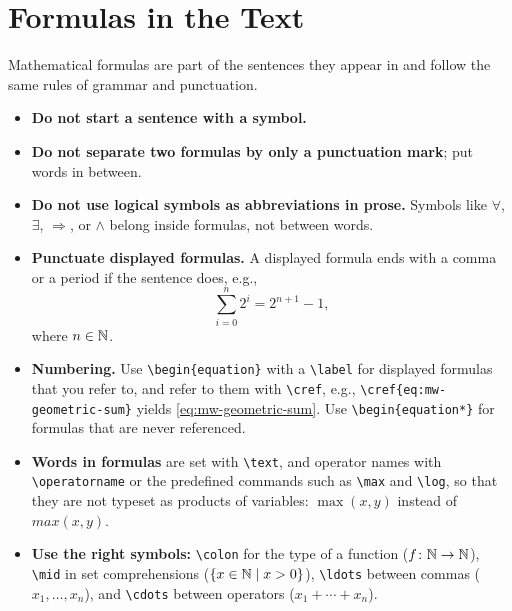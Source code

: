 \section{Formulas in the Text}\label{sec:mw-formulas}

Mathematical formulas are part of the sentences they appear in and follow the
same rules of grammar and punctuation.

\begin{itemize}
    \item \textbf{Do not start a sentence with a symbol.}
    \item \textbf{Do not separate two formulas by only a punctuation mark};
          put words in between.
    \item \textbf{Do not use logical symbols as abbreviations in prose.}
          Symbols like $\forall$, $\exists$, $\Rightarrow$, or $\wedge$
          belong inside formulas, not between words.
    \item \textbf{Punctuate displayed formulas.}
          A displayed formula ends with a comma or a period if the sentence
          does, e.g.,
          \begin{equation}\label{eq:mw-geometric-sum}
              \sum_{i=0}^{n} 2^i = 2^{n+1} - 1,
          \end{equation}
          where $n \in \mathbb{N}$.
    \item \textbf{Numbering.}
          Use \lstinline|\begin{equation}| with a \lstinline|\label| for
          displayed formulas that you refer to, and refer to them with
          \lstinline|\cref|, e.g., \lstinline|\cref{eq:mw-geometric-sum}|
          yields \cref{eq:mw-geometric-sum}.
          Use \lstinline|\begin{equation*}| for formulas that are never
          referenced.
    \item \textbf{Words in formulas} are set with \lstinline|\text|, and
          operator names with \lstinline|\operatorname| or the predefined
          commands such as \lstinline|\max| and \lstinline|\log|, so that they
          are not typeset as products of variables:
          $\max(x, y)$ instead of $max(x, y)$.
    \item \textbf{Use the right symbols:}
          \lstinline|\colon| for the type of a function
          ($f \colon \mathbb{N} \to \mathbb{N}$),
          \lstinline|\mid| in set comprehensions
          ($\lbrace x \in \mathbb{N} \mid x > 0\rbrace$),
          \lstinline|\ldots| between commas ($x_1, \ldots, x_n$), and
          \lstinline|\cdots| between operators ($x_1 + \cdots + x_n$).
\end{itemize}

